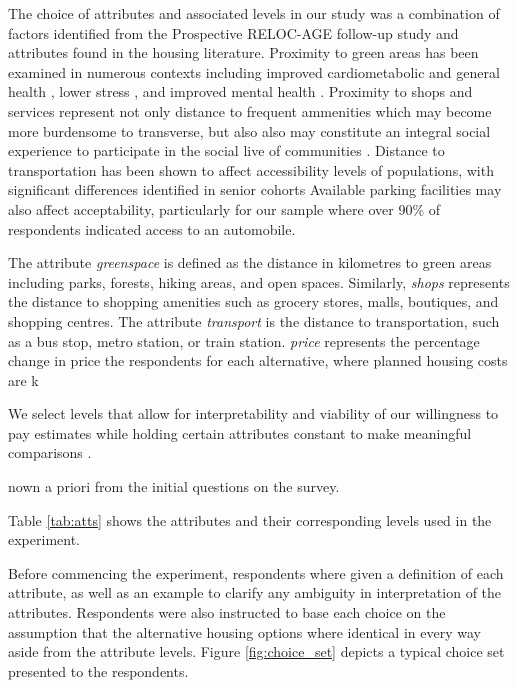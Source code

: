 \documentclass[3p,11pt ]{elsarticle}
\begin{document}
The choice of attributes and associated levels in our study was a combination of factors identified from the Prospective RELOC-AGE follow-up study and attributes found in the housing literature.
Proximity to green areas has been examined in numerous contexts including improved cardiometabolic and general health \citep{paquetAreAccessibilityCharacteristics2013,  maasGreenSpaceUrbanity2006},
lower stress \citep{nielsenGreenAreasAffect2007},
and improved mental health \citep{cohen-clineAccessGreenSpace2015,sturmProximityUrbanParks2014}.
Proximity to shops and services represent not only distance to frequent ammenities which may become more burdensome to transverse,
but also also may constitute an integral social experience to participate in the social live of communities
\citep{lucasMethodEvaluateEquitable2016}.
Distance to transportation has been shown to affect  accessibility levels of populations,
with significant differences identified in senior cohorts \citep{ricciardiExploringPublicTransport2015,hildebrandDimensionsElderlyTravel2003,alsnihMobilityAccessibilityExpectations2003}
Available parking facilities may also affect acceptability,
particularly for our sample where over 90\% of respondents indicated access to an automobile.

The attribute \textit{greenspace} is defined as the distance in kilometres to green areas including parks, forests, hiking areas, and open spaces.
Similarly,
\textit{shops} represents the distance to shopping amenities such as grocery stores, malls, boutiques, and shopping centres.
The attribute \textit{transport} is the distance to transportation, such as a bus stop, metro station, or train station.
\textit{price} represents the percentage change in price the respondents for each alternative,
where planned housing costs are k


We select levels that allow for interpretability and viability of our willingness to pay estimates while holding certain attributes constant to make meaningful comparisons \citep{hensherAppliedChoiceAnalysis2015}.


nown a priori from the initial questions on the survey.



Table \ref{tab:atts}  shows the attributes and their corresponding levels used in the experiment.




Before commencing the experiment,
respondents where given a definition of each attribute, as well as an example to clarify any ambiguity in interpretation of the attributes.
Respondents were also instructed to base each choice on the assumption that the alternative housing options where identical in every way aside from the attribute levels.
Figure \ref{fig:choice_set} depicts a typical choice set presented to the respondents.
\end{document}
